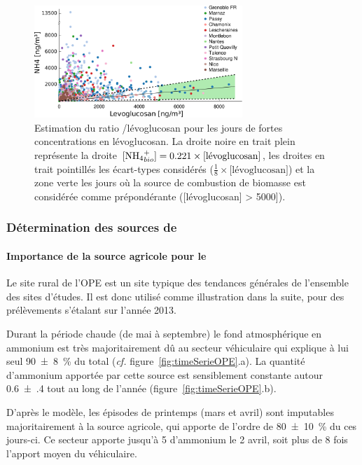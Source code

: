 \begin{figure}[ht]
    \centering
    \includegraphics[width=0.7\textwidth]{figures/INACS/MCA_correlNH4Levo_alea.pdf}
    \caption{Estimation du ratio \NHq/lévoglucosan pour les jours de fortes concentrations en
        lévoglucosan. La droite noire en trait plein représente la droite $[\NHq_{bio}]=
        0.221 \times \text{[lévoglucosan]}$, les droites en trait pointillés les
        écart-types considérés ($\frac{1}{8}\times \text{[lévoglucosan]}$) et la zone
        verte les jours où la source de combustion de biomasse est considérée comme
        prépondérante ([lévoglucosan] > \SI{5000}{\ngm}]).
    }
    \label{fig:correlNH4Levo}
\end{figure}

\subsubsection{Détermination des sources de \NHq}%
\label{ssub:determination_des_sources_de_NHq}

\paragraph{Importance de la source agricole pour le \NHq}%
\label{par:importance_de_la_source_agricole_pour_le_nhq}

Le site rural de l'OPE est un site typique des tendances générales de l'ensemble des sites
d'études.
Il est donc utilisé comme illustration dans la suite, pour des prélèvements s'étalant sur
l'année 2013.

Durant la période chaude (de mai à septembre) le fond atmosphérique en ammonium est très
majoritairement dû au secteur véhiculaire qui explique à lui seul \SI{90(8)}{\percent} du
\NHq{} total (\textit{cf.} figure~\ref{fig:timeSerieOPE}.a).
La quantité d'ammonium apportée par cette source est sensiblement constante autour
\SI{0.6(4)}{\ugm} tout au long de l'année (figure~\ref{fig:timeSerieOPE}.b).

D'après le modèle, les épisodes de printemps (mars et avril) sont imputables
majoritairement à la source agricole, qui apporte de l'ordre de \SI{80(10)}{\percent} du
\NHq{} ces jours-ci.  Ce secteur apporte jusqu'à \SI{5}{\ugm} d'ammonium le 2 avril, soit
plus de 8 fois l'apport moyen du véhiculaire.

